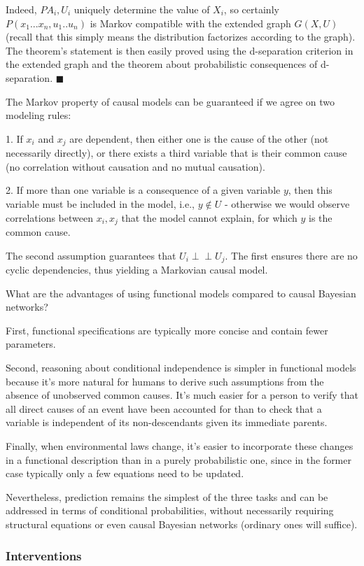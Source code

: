 \documentclass[fleqn]{article}
\newcommand{\independent}{\perp \!\!\! \perp}
\numberwithin{equation}{section}
\numberwithin{theorem}{section}
\numberwithin{figure}{section}
\numberwithin{lemma}{section}
\numberwithin{corollary}{section}
\begin{document}
Indeed, $PA_i,U_i$ uniquely determine the value of $X_i$, so certainly $P(x_1...x_n, u_1..u_n)$ is Markov compatible with the extended graph $G(X,U)$ (recall that this simply means the distribution factorizes according to the graph). The theorem's statement is then easily proved using the d-separation criterion in the extended graph and the theorem about probabilistic consequences of d-separation.
$\blacksquare$

The Markov property of causal models can be guaranteed if we agree on two modeling rules:

1. If $x_i$ and $x_j$ are dependent, then either one is the cause of the other (not necessarily directly), or there exists a third variable that is their common cause (no correlation without causation and no mutual causation).

2. If more than one variable is a consequence of a given variable $y$, then this variable must be included in the model, i.e., $y \notin U$ - otherwise we would observe correlations between $x_i, x_j$ that the model cannot explain, for which $y$ is the common cause.

The second assumption guarantees that $U_i \independent U_j$. The first ensures there are no cyclic dependencies, thus yielding a Markovian causal model.

What are the advantages of using functional models compared to causal Bayesian networks?  

First, functional specifications are typically more concise and contain fewer parameters.

Second, reasoning about conditional independence is simpler in functional models because it's more natural for humans to derive such assumptions from the absence of unobserved common causes. It's much easier for a person to verify that all direct causes of an event have been accounted for than to check that a variable is independent of its non-descendants given its immediate parents.

Finally, when environmental laws change, it's easier to incorporate these changes in a functional description than in a purely probabilistic one, since in the former case typically only a few equations need to be updated.

Nevertheless, prediction remains the simplest of the three tasks and can be addressed in terms of conditional probabilities, without necessarily requiring structural equations or even causal Bayesian networks (ordinary ones will suffice).

\subsubsection*{Interventions}
\end{document}
